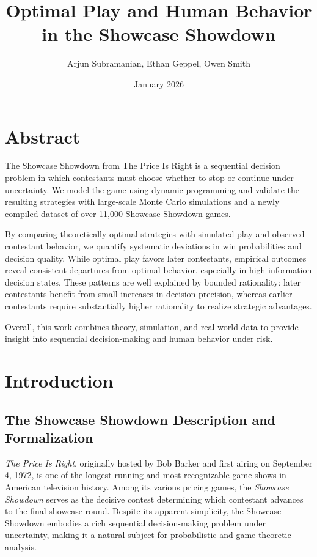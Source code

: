 \documentclass[titlepage,12pt]{article}
\title{Optimal Play and Human Behavior in the Showcase Showdown}
\author{Arjun Subramanian, Ethan Geppel, Owen Smith}
\date{January 2026}
\begin{document}
\maketitle


\tableofcontents
\newpage

\section{Abstract}
The Showcase Showdown from The Price Is Right is a sequential decision problem in which contestants must choose whether to stop or continue under uncertainty. We model the game using dynamic programming and validate the resulting strategies with large-scale Monte Carlo simulations and a newly compiled dataset of over 11,000 Showcase Showdown games.

By comparing theoretically optimal strategies with simulated play and observed contestant behavior, we quantify systematic deviations in win probabilities and decision quality. While optimal play favors later contestants, empirical outcomes reveal consistent departures from optimal behavior, especially in high-information decision states. These patterns are well explained by bounded rationality: later contestants benefit from small increases in decision precision, whereas earlier contestants require substantially higher rationality to realize strategic advantages.

Overall, this work combines theory, simulation, and real-world data to provide insight into sequential decision-making and human behavior under risk.

\section{Introduction}

\subsection{The Showcase Showdown Description and Formalization}

\emph{The Price Is Right}, originally hosted by Bob Barker and first airing on September 4, 1972, is one of the longest-running and most recognizable game shows in American television history. Among its various pricing games, the \emph{Showcase Showdown} serves as the decisive contest determining which contestant advances to the final showcase round. Despite its apparent simplicity, the Showcase Showdown embodies a rich sequential decision-making problem under uncertainty, making it a natural subject for probabilistic and game-theoretic analysis.
\end{document}
